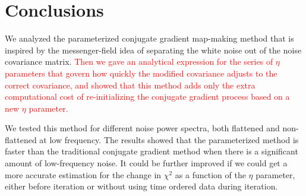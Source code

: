 \documentclass[twocolumn,linenumbers]{aastex631}
\newcommand{\Eq}[1]{\text{Eq.\,\ref{#1}}}
\newcommand{\Figure}[1]{\text{Figure \ref{#1}}}
\newcommand{\vbd}{\vb{d}}
\newcommand{\hatm}{\vb{\hat{m}}}
\newcommand{\kmh}[1]{\textcolor{red}{#1}}
\begin{document}
%
%




\section{Conclusions} \label{sec:conclusions} 


We analyzed {the} parameterized conjugate gradient map-making method that is inspired by the messenger-field idea of
separating the white noise out of {the} noise covariance matrix.
\kmh{Then we gave an analytical expression for the series of $\eta$ parameters that govern how quickly the modified covariance adjusts to the correct covariance,
and showed that this method adds only the extra computational cost of re-initializing the conjugate gradient process based on a new $\eta$ parameter.}

We tested this method for different noise power {spectra}, both flattened and non-flattened at low frequency.
The results showed that the parameterized method is faster than the traditional conjugate gradient method 
when there is a significant amount of low-frequency noise.
It could be further improved if we could get a more accurate estimation for the change in $\chi^2$ as a function of the $\eta$ parameter, either before iteration or without using time ordered data during iteration.
\end{document}
